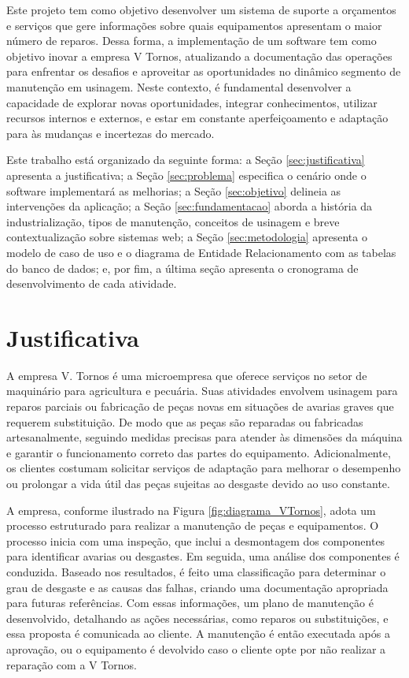 Este projeto tem como objetivo desenvolver um sistema de suporte a orçamentos e serviços que gere informações sobre quais equipamentos apresentam o maior número de reparos. Dessa forma, a implementação de um software tem como objetivo inovar a empresa V Tornos, atualizando a documentação das operações para enfrentar os desafios e aproveitar as oportunidades no dinâmico segmento de manutenção em usinagem. Neste contexto, é fundamental desenvolver a capacidade de explorar novas oportunidades, integrar conhecimentos, utilizar recursos internos e externos, e estar em constante aperfeiçoamento e adaptação para às mudanças e incertezas do mercado.


Este trabalho está organizado da seguinte forma: a Seção \ref{sec:justificativa} apresenta a justificativa; a Seção \ref{sec:problema} especifica o cenário onde o software implementará as melhorias; a Seção \ref{sec:objetivo} delineia as intervenções da aplicação; a Seção \ref{sec:fundamentacao} aborda a história da industrialização, tipos de manutenção, conceitos de usinagem e breve contextualização sobre sistemas web; a Seção \ref{sec:metodologia} apresenta o modelo de caso de uso e o diagrama de Entidade Relacionamento com as tabelas do banco de dados; e, por fim, a última seção apresenta o cronograma de desenvolvimento de cada atividade.

\section{Justificativa}\label{sec:Justificativa}

A empresa V. Tornos é uma microempresa que oferece serviços no setor de maquinário para agricultura e pecuária. Suas atividades envolvem usinagem para reparos parciais ou fabricação de peças novas em situações de avarias graves que requerem substituição. De modo que as peças são reparadas ou fabricadas artesanalmente, seguindo medidas precisas para atender às dimensões da máquina e garantir o funcionamento correto das partes do equipamento. Adicionalmente, os clientes costumam solicitar serviços de adaptação para melhorar o desempenho ou prolongar a vida útil das peças sujeitas ao desgaste devido ao uso constante.

A empresa, conforme ilustrado na Figura \ref{fig:diagrama_VTornos}, adota um processo estruturado para realizar a manutenção de peças e equipamentos. O processo inicia com uma inspeção, que inclui a desmontagem dos componentes para identificar avarias ou desgastes. Em seguida, uma análise dos componentes é conduzida. Baseado nos resultados, é feito uma classificação para determinar o grau de desgaste e as causas das falhas, criando uma documentação apropriada para futuras referências. Com essas informações, um plano de manutenção é desenvolvido, detalhando as ações necessárias, como reparos ou substituições, e essa proposta é comunicada ao cliente. A manutenção é então executada após a aprovação, ou o equipamento é devolvido caso o cliente opte por não realizar a reparação com a V Tornos.

